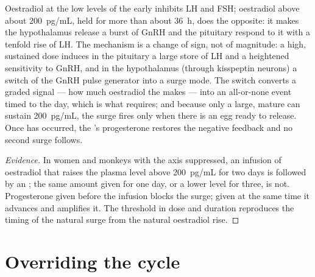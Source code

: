 \begin{theorem}\label{thm:b2:reproductive-hormones:switch}
Oestradiol at the low levels of the early 
inhibits LH and FSH; oestradiol above about \qty{200}{pg/mL}, held
for more than about \qty{36}{h}, does the opposite: it makes the
hypothalamus release a burst of GnRH and the pituitary respond to it
with a tenfold rise of LH. The mechanism is a change of sign, not
of magnitude: a high, sustained dose induces in the pituitary a
large store of LH and a heightened sensitivity to GnRH, and in the
hypothalamus (through kisspeptin neurons) a switch of the GnRH
pulse generator into a surge mode. The switch converts a graded
signal --- how much oestradiol the  makes --- into an
all-or-none event timed to the day, which is what 
requires; and because only a large, mature  can sustain
\qty{200}{pg/mL}, the surge fires only when there is an egg ready to
release. Once  has occurred, the 's
progesterone restores the negative feedback and no second surge
follows.
\end{theorem}
\begin{proof}[Evidence]
In women and monkeys with the axis suppressed, an infusion of
oestradiol that raises the plasma level above \qty{200}{pg/mL} for
two days is followed by an ; the same amount given for one
day, or a lower level for three, is not. Progesterone given before
the infusion blocks the surge; given at the same time it advances
and amplifies it. The threshold in dose and duration reproduces the
timing of the natural surge from the natural oestradiol rise.
\end{proof}

\section{Overriding the cycle}


